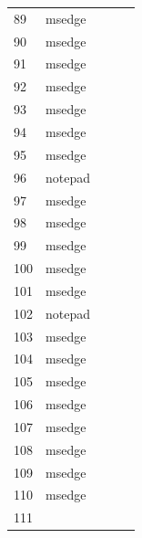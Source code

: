 \documentclass[a4paper,twoside,12pt]{book}
\begin{document}
\begin{appendices}
\begin{table}
\begin{tabular}{lllll}
	89  &         msedge &                &                &                \\
	90  &         msedge &                &                &                \\
	91  &         msedge &                &                &                \\
	92  &         msedge &                &                &                \\
	93  &         msedge &                &                &                \\
	94  &         msedge &                &                &                \\
	95  &         msedge &                &                &                \\
	96  &        notepad &                &                &                \\
	97  &         msedge &                &                &                \\
	98  &         msedge &                &                &                \\
	99  &         msedge &                &                &                \\
	100 &         msedge &                &                &                \\
	101 &         msedge &                &                &                \\
	102 &        notepad &                &                &                \\
	103 &         msedge &                &                &                \\
	104 &         msedge &                &                &                \\
	105 &         msedge &                &                &                \\
	106 &         msedge &                &                &                \\
	107 &         msedge &                &                &                \\
	108 &         msedge &                &                &                \\
	109 &         msedge &                &                &                \\
	110 &         msedge &                &                &                \\
	111 &                &                &                &                \\

\end{tabular}
\end{table}
\end{appendices}
\end{document}

